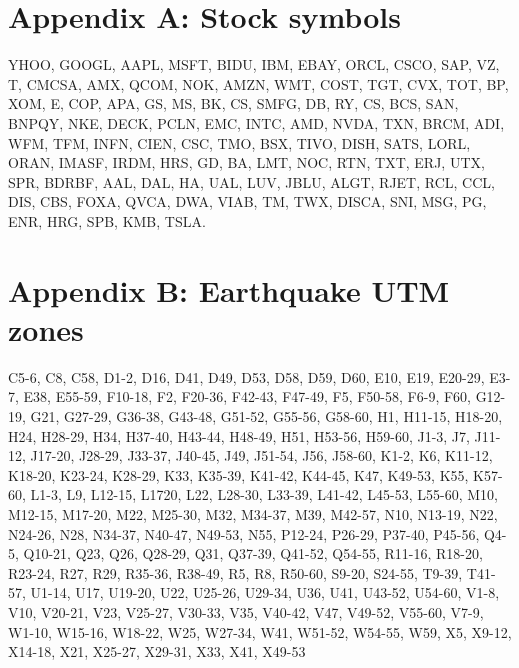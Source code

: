 \documentclass{article}
\begin{document}
\appendix
\section*{Appendix A: Stock symbols}
\label{AppA}

YHOO, GOOGL, AAPL, MSFT, BIDU, IBM, EBAY, ORCL, CSCO, SAP, VZ, T, CMCSA, AMX, QCOM, NOK, AMZN, WMT, COST, TGT, CVX, TOT, BP, XOM, E, COP, APA, GS, MS, BK, CS, SMFG, DB, RY, CS, BCS, SAN, BNPQY, NKE, DECK, PCLN, EMC, INTC, AMD, NVDA, TXN, BRCM, ADI, WFM, TFM, INFN, CIEN, CSC, TMO, BSX, TIVO, DISH, SATS, LORL, ORAN, IMASF, IRDM, HRS, GD, BA, LMT, NOC, RTN, TXT, ERJ, UTX, SPR, BDRBF, AAL, DAL, HA, UAL, LUV, JBLU, ALGT, RJET, RCL, CCL, DIS, CBS, FOXA, QVCA, DWA, VIAB, TM, TWX, DISCA, SNI, MSG, PG, ENR, HRG, SPB, KMB, TSLA.

\section*{Appendix B: Earthquake UTM zones}
\label{AppB}

C5-6, C8, C58, D1-2, D16, D41, D49, D53, D58, D59, D60, E10, E19, E20-29, E3-7, E38, E55-59, F10-18, F2, F20-36, F42-43, F47-49, F5, F50-58, F6-9, F60, G12-19, G21, G27-29, G36-38, G43-48, G51-52, G55-56, G58-60, H1, H11-15, H18-20, H24, H28-29, H34, H37-40, H43-44, H48-49, H51, H53-56, H59-60, J1-3,  J7, J11-12, J17-20, J28-29, J33-37, J40-45, J49, J51-54, J56, J58-60, K1-2,  K6, K11-12, K18-20, K23-24, K28-29, K33, K35-39, K41-42, K44-45, K47, K49-53, K55, K57-60, L1-3, L9, L12-15, L1720, L22, L28-30, L33-39, L41-42, L45-53, L55-60,  M10, M12-15, M17-20, M22, M25-30, M32, M34-37, M39, M42-57, N10, N13-19, N22, N24-26, N28, N34-37, N40-47, N49-53, N55, P12-24, P26-29, P37-40, P45-56, Q4-5, Q10-21, Q23, Q26, Q28-29, Q31, Q37-39, Q41-52, Q54-55, R11-16, R18-20, R23-24, R27, R29, R35-36, R38-49, R5, R8, R50-60, S9-20, S24-55,  T9-39, T41-57, U1-14, U17, U19-20, U22, U25-26, U29-34, U36, U41, U43-52, U54-60, V1-8, V10, V20-21, V23, V25-27, V30-33, V35, V40-42, V47, V49-52, V55-60, V7-9, W1-10, W15-16, W18-22, W25, W27-34, W41, W51-52, W54-55, W59, X5, X9-12, X14-18, X21, X25-27, X29-31, X33, X41, X49-53
\end{document}
